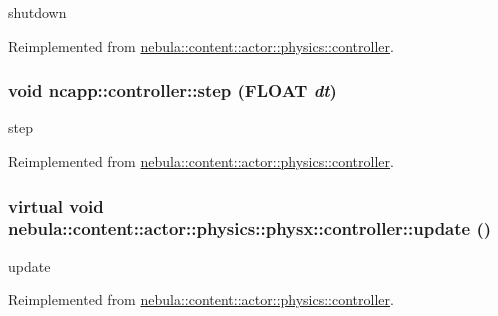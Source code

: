 shutdown 

Reimplemented from \hyperlink{classnebula_1_1content_1_1actor_1_1physics_1_1controller_a826208e0d0b4cdcf52882b4eab3bd361}{nebula::content::actor::physics::controller}.\hypertarget{classnebula_1_1content_1_1actor_1_1physics_1_1physx_1_1controller_ab94ef93726ec1cd77c12547149aa8243}{
\subsubsection[{step}]{\setlength{\rightskip}{0pt plus 5cm}void ncapp::controller::step (FLOAT {\em dt})}}
\label{classnebula_1_1content_1_1actor_1_1physics_1_1physx_1_1controller_ab94ef93726ec1cd77c12547149aa8243}


step 

Reimplemented from \hyperlink{classnebula_1_1content_1_1actor_1_1physics_1_1controller_a55c45452e5e54d1872035effd2933f4a}{nebula::content::actor::physics::controller}.\hypertarget{classnebula_1_1content_1_1actor_1_1physics_1_1physx_1_1controller_afea1c03aa36b31ee843464c708711ded}{
\subsubsection[{update}]{\setlength{\rightskip}{0pt plus 5cm}virtual void nebula::content::actor::physics::physx::controller::update ()}}
\label{classnebula_1_1content_1_1actor_1_1physics_1_1physx_1_1controller_afea1c03aa36b31ee843464c708711ded}


update 

Reimplemented from \hyperlink{classnebula_1_1content_1_1actor_1_1physics_1_1controller_abda74fc66665e489ae6364efd1eb7e30}{nebula::content::actor::physics::controller}.

